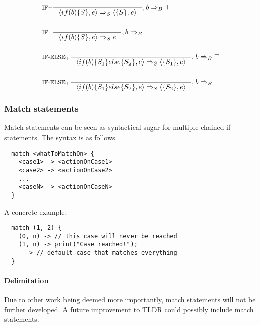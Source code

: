 \begin{align*}
&\inference[$\text{IF}_\top$]{}
                      {\Braket{if(b)\{S\},e} \Rightarrow_S \Braket{\{S\},e}}
                      {,b \Rightarrow_B \top}
\\\\
&\inference[$\text{IF}_\bot$]{}
                      {\Braket{if(b)\{S\},e} \Rightarrow_S e}
                      {,b \Rightarrow_B \bot}
\\\\
&\inference[$\text{IF-ELSE}_\top$]{}
                      {\Braket{if(b)\{S_1\}else\{S_2\},e} \Rightarrow_S \Braket{\{S_1\},e}}
                      {,b \Rightarrow_B \top}
\\\\
&\inference[$\text{IF-ELSE}_\bot$]{}
                      {\Braket{if(b)\{S_1\}else\{S_2\},e} \Rightarrow_S \Braket{\{S_2\},e}}
                      {,b \Rightarrow_B \bot}
\end{align*}

\subsubsection{Match statements}
\label{subsec:matchStatements}

Match statements can be seen as syntactical sugar for multiple chained if-statements. The syntax is as follows.

\begin{verbatim}
  match <whatToMatchOn> {
    <case1> -> <actionOnCase1>
    <case2> -> <actionOnCase2>
    ...
    <caseN> -> <actionOnCaseN>
  }
\end{verbatim}

A concrete example:

\begin{verbatim}
  match (1, 2) {
    (0, n) -> // this case will never be reached
    (1, n) -> print("Case reached!");
    _ -> // default case that matches everything
  }
\end{verbatim}

\paragraph{Delimitation}

Due to other work being deemed more importantly, match statements will not be further developed. A future improvement to TLDR could possibly include match statements.